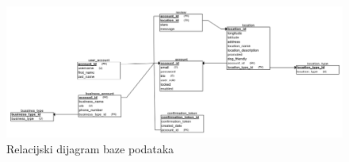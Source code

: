         \begin{figure}[H]
    		\includegraphics[width=\textwidth]{img/rel_dijagram.png}
    		\centering
    		\caption{Relacijski dijagram baze podataka}
    		\label{fig:promjene}
    	\end{figure}
			
	\eject
        
    
